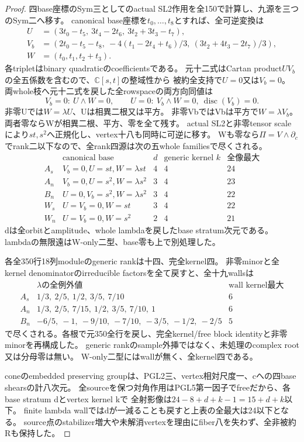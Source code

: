 \documentclass[a4paper,11pt]{ltjsarticle}
\theoremstyle{definition}
\begin{document}
\begin{proof}
四base座標のSym三としてのactual SL2作用を全150で計算し、九源を三つのSym二へ移す。
canonical base座標を$t_0,\ldots,t_8$とすれば、全可逆変換は
\[
\begin{split}
 U&=(3t_0-t_5,\ 3t_4-2t_6,\ 3t_2+3t_3-t_7),\\
 V_b&=(2t_0-t_5-t_8,\ -4(t_1-2t_4+t_6)/3,\ (3t_2+4t_3-2t_7)/3),\\
 W&=(t_0,t_1,t_2+t_3).
\end{split}
\]
各tripletはbinary quadraticのcoefficientsである。
元十二式はCartan product$UV_b$の全五係数を含むので、$\mathbb C[s,t]$の整域性から
被約全支持で$U=0$又は$V_b=0$。
両whole枝へ元十二式を戻した全rowspaceの両方向同値は
\[
 V_b=0:\ U\wedge W=0,\qquad
 U=0:\ V_b\wedge W=0,\ \operatorname{disc}(V_b)=0.
\]
非零Uでは$W=\lambda U$、Uは相異二根又は平方。
非零VbではVbは平方で$W=\lambda V_b$。
両者零ならWが相異二根、平方、零を全て残す。
actual SL2と非零tensor scaleにより$st,s^2$へ正規化し、vertex十八も同時に可逆に移す。
Wも零なら$\Pi=V\wedge\partial_c$でrank二以下なので、全rank四源は次の五whole familiesで尽くされる。
\[
\begin{array}{c|c|c|c|c}
 &\text{canonical base}&d&\text{generic kernel }k&\text{全像最大}\\\hline
 A_s&V_b=0,U=st,W=\lambda st&4&4&24\\
 A_n&V_b=0,U=s^2,W=\lambda s^2&3&4&23\\
 B_n&U=0,V_b=s^2,W=\lambda s^2&3&4&22\\
 W_s&U=V_b=0,W=st&3&4&22\\
 W_n&U=V_b=0,W=s^2&2&4&21
\end{array}
\]
dは全orbitとamplitude、whole lambdaを戻したbase stratum次元である。
lambdaの無限遠はW-only二型、base零も上で別処理した。

各全350行18列moduleのgeneric rankは十四、完全kernel四。
非零minorと全kernel denominatorのirreducible factorsを全て戻すと、全十九wallsは
\[
\begin{array}{c|l|c}
 &\lambda\text{の全例外値}&\text{wall kernel最大}\\\hline
 A_s&1/3,\ 2/5,\ 1/2,\ 3/5,\ 7/10&6\\
 A_n&1/3,\ 2/5,\ 7/15,\ 1/2,\ 3/5,\ 7/10,\ 1&6\\
 B_n&-6/5,\ -1,\ -9/10,\ -7/10,\ -3/5,\ -1/2,\ -2/5&5
\end{array}
\]
で尽くされる。各根で元350全行を戻し、完全kernel/free block identityと非零minorを再構成した。
generic rankのsample外挿ではなく、未処理のcomplex root又は分母零は無い。
W-only二型にはwallが無く、全kernel四である。

coneのembedded preserving groupは、PGL2三、vertex相対尺度一、cへの四base shearsの計八次元。
全sourceを保つ対角作用はPGL5第一因子でfreeだから、各base stratum dとvertex kernel kで
全射影像は$24-8+d+k-1=15+d+k$以下。
finite lambda wallではdが一減ることも戻すと上表の全最大は24以下となる。
source点のstabilizer増大や未解消vertexを理由にfiber八を失わず、全非被約Rも保持した。
\end{proof}
\end{document}
